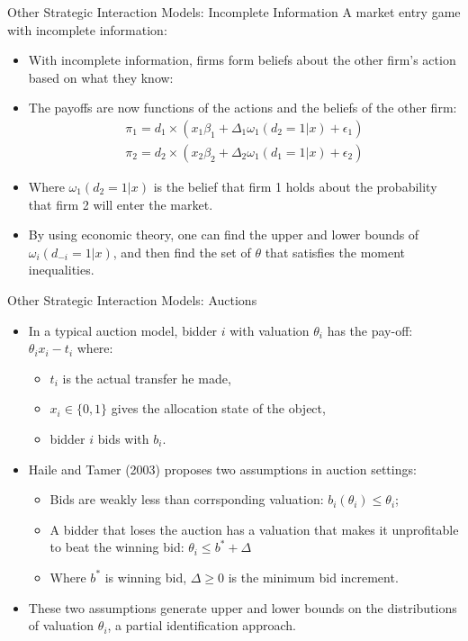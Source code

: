 \documentclass[aspectratio=169]{beamer}  %
\begin{document}
\begin{frame}{Other Strategic Interaction Models: Incomplete Information}
A market entry game with incomplete information:
\begin{itemize}
    \item With incomplete information, firms form beliefs about the other firm's action based on what they know:
    \item The payoffs are now functions of the actions and the beliefs of the other firm:
    \begin{align*}
        \pi_1 = d_1 \times (x_1 \beta_1 + \Delta_1 \omega_1(d_2 = 1| x) + \epsilon_1) \\
        \pi_2 = d_2 \times (x_2 \beta_2 + \Delta_2 \omega_1(d_1 = 1 | x) + \epsilon_2)
    \end{align*}
    \item Where $\omega_1(d_2 = 1| x)$ is the belief that firm 1 holds about the probability that firm 2 will enter the market.
    \item By using economic theory, one can find the upper and lower bounds of $\omega_i(d_{-i} = 1| x)$, and then find the set of $\theta$ that satisfies the moment inequalities.
\end{itemize}

\end{frame}

\begin{frame}{Other Strategic Interaction Models: Auctions}
\begin{itemize}
    \item In a typical auction model, bidder $i$ with valuation $\theta_i$ has the pay-off: $\theta_i x_i - t_i$ where:
        \begin{itemize}
        \item $t_i$ is the actual transfer he made,
        \item $x_i \in \{0, 1\}$ gives the allocation state of the object,
        \item bidder $i$ bids with $b_i$.
        \end{itemize}

    \item Haile and Tamer (2003) proposes two assumptions in auction settings:
    \begin{itemize}
    \item Bids are weakly less than corrsponding valuation: $b_i(\theta_i) \leq \theta_i$;
    \item A bidder that loses the auction has a valuation that makes it unprofitable to beat the winning bid: $\theta_i \leq b^* + \Delta$
    \item Where $b^*$ is winning bid, $\Delta \geq 0$ is the minimum bid increment.
    \end{itemize}
    \item These two assumptions generate upper and lower bounds on the distributions of valuation $\theta_i$, a partial identification approach.
\end{itemize}
\end{frame}
\end{document}
